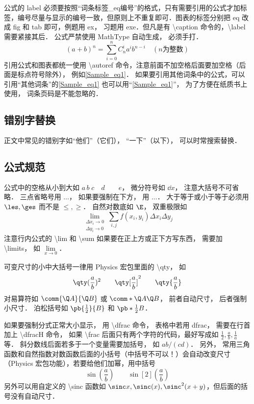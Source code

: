 公式的 label 必须要按照“词条标签\_eq编号”的格式，只有需要引用的公式才加标签，编号尽量与显示的编号一致，但原则上不重复即可．图表的标签分别把 eq 改成 fig 和 tab 即可，例题用 ex， 习题用 exe．但凡是有 \textbackslash caption 命令的，\textbackslash label 需要紧接其后． 公式严禁使用 MathType 自动生成， 必须手打．
\begin{equation}\label{Sample_eq1}
(a+b)^n = \sum_{i=0}^n C_n^i a^i b^{n-i} \quad (n\text{为整数})
\end{equation}
引用公式和图表都统一使用 \textbackslash autoref 命令，注意前面不加空格后面要加空格（后面是标点符号除外）， 例如\autoref{Sample_eq1}． 如果要引用其他词条中的公式，可以引用“其他词条”的\autoref{Sample_eq1} 也可以用“\autoref{Sample_eq1}”， 为了方便在纸质书上使用， 词条页码是不能忽略的．

\subsection{错别字替换}
正文中常见的错别字如“他们”（它们）， “一下”（以下）， 可以时常搜索替换．

\subsection{公式规范}
公式中的空格从小到大如 $a\, b\; c\quad d\qquad e$， 微分符号如 $\dd{x}$， 注意大括号不可省略． 三点省略号用 $\dots$， 如果要强制在下方， 用 $\ldots$． 大于等于或小于等于必须用 $\les, \ges$ 而不是 $\le, \ge$． 自然对数底如 $\E$， 双重极限如
\begin{equation}
\lim_{\substack{\Delta x_i\to 0\\ \Delta y_i\to 0}} \sum_{i, j} f(x_i,y_i) \Delta x_i \Delta y_j
\end{equation}
注意行内公式的 \textbackslash lim 和 \textbackslash sum 如果要在正上方或正下方写东西， 需要加 \textbackslash limits， 如 $\lim\limits_{x\to 0}$．

可变尺寸的小中大括号一律用 Physics 宏包里面的 \textbackslash qty， 如
\begin{equation}
\qty(\frac ab)^2 \qquad \qty[\frac ab]^2 \qquad \qty{ \frac ab}
\end{equation}
对易算符如 $\comm{\Q A}{\Q B}$ 或 $\comm*{\Q A}{\Q B}$， 前者自动尺寸， 后者强制小尺寸． 泊松括号如 $\pb{\frac12}{B}$ 和 $\pb*{\frac12}{B}$．

如果要强制分式正常大小显示， 用 \textbackslash dfrac 命令， 表格中若用 dfrac， 需要在行首加上 \textbackslash dfracH 命令， 如果 \textbackslash frac 后面只有两个字符的代码，最好写成如 $\frac12, \frac ab, \frac1a$ 等． 斜分数线后面若多于一个变量需要加括号， 如 $ab/(cd)$． 另外， 常用三角函数和自然指数对数函数后面的小括号（中括号不可以！）会自动改变尺寸（Physics 宏包功能），若要给他们加幂，用中括号
\begin{equation}
\sin(\frac ab) \qquad \sin[2](\frac ab)
\end{equation}
另外可以用自定义的 \textbackslash sinc 函数如 $\sinc x, \sinc(x), \sinc^2(x+y)$，但后面的括号没有自动尺寸．

